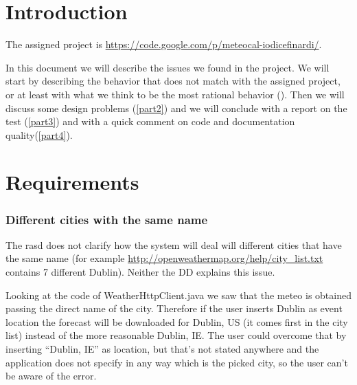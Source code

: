 \documentclass[10pt,a4paper,titlepage]{article}
\begin{document}


\tableofcontents

\pagebreak
\part{Introduction}
The assigned project is \url{https://code.google.com/p/meteocal-iodicefinardi/}.

In this document we will describe the issues we found in the project. We will start by describing the behavior that does not match with the assigned project, or at least with what we think to be the most rational behavior (\ref{part1}). Then we will discuss some design problems (\ref{part2}) and we will conclude with a report on the test (\ref{part3}) and with a quick comment on code and documentation quality(\ref{part4}).

\pagebreak
\part{Requirements}
\label{part1}
\section{Different cities with the same name}
The rasd does not clarify how the system will deal will different cities that have the same name (for example \url{http://openweathermap.org/help/city_list.txt} contains 7 different Dublin). Neither the DD explains this issue.

Looking at the code of WeatherHttpClient.java we saw that the meteo is obtained passing the direct name of the city. Therefore if the user inserts Dublin as event location the forecast will be downloaded for Dublin, US (it comes first in the city list) instead of the more reasonable Dublin, IE. The user could overcome that by inserting ``Dublin, IE'' as location, but that's not stated anywhere and the application does not specify in any way which is the picked city, so the user can't be aware of the error.
\end{document}
